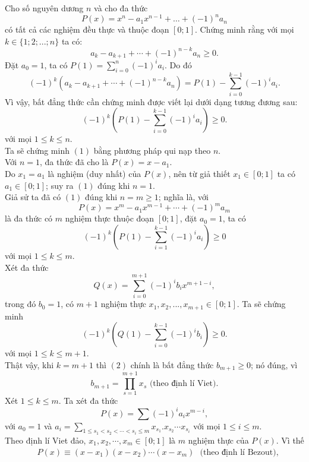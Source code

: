 \begin{bt}%
	Cho số nguyên dương $ n $ và cho đa thức 
	\[ P(x) = x^n - a_1 x^{n-1} + \dots + (-1)^n a_n \]
	có tất cả các nghiệm đều thực và thuộc đoạn $ \left [ 0;1 \right ] $.
	Chứng minh rằng với mọi $ k \in \{1;2;...;n \} $ ta có:
	\[ a_k - a_{k+1} + \cdots + (-1)^{n-k}a_n \ge 0. \]
	\loigiai
	{
		Đặt $ a_0 = 1 $, ta có $ P(1) = \sum\limits_{i=0}^{n} (-1)^i a_i $. Do đó
		\[ (-1)^k \left(a_k - a_{k+1} + \cdots + (-1)^{n-k} a_n \right) = P(1) - \sum\limits_{i=0}^{k-1} (-1)^i a_i. \]
		Vì vậy, bất đẳng thức cần chứng minh được viết lại dưới dạng tương đương sau:
		\[ (-1)^k\left(P(1) - \sum\limits_{i=0}^{k-1} (-1)^i a_i \right) \ge 0.\tag{1}\]
		với mọi $ 1 \le k \le n $.\\
		Ta sẽ chứng minh $ (1) $ bằng phương pháp qui nạp theo $ n $.\\
		Với $ n = 1 $, đa thức đã cho là $ P(x) = x - a_1 $.\\
		Do $ x_1 = a_1 $ là nghiệm (duy nhất) của $ P(x) $, nên từ giả thiết $ x_1 \in \left[0;1 \right]  $ ta có $ a_1 \in \left[0;1 \right]  $; suy ra $ (1) $ đúng khi $ n=1 $.\\
		Giả sử ta đã có $ (1) $ đúng khi $ n = m \ge 1 $; nghĩa là, với
		\[ P(x) = x^m - a_1 x^{m-1} + \cdots + (-1)^ma_m \]
		là đa thức có $ m $ nghiệm thực thuộc đoạn $ \left[ 0;1\right]  $, đặt $ a_0 = 1 $, ta có
		\[ (-1)^k \left(P(1) - \sum\limits_{i=1}^{k-1} (-1)^ia_i \right)  \ge 0 \]
		với mọi $ 1 \le k \le m $.\\
		Xét đa thức
		\[ Q(x) = \sum\limits_{i=0}^{m+1}(-1)^ib_ix^{m+1-i}, \]
		trong đó $ b_0 = 1 $, có $ m+1 $ nghiệm thực $ x_1, x_2 ,..., x_{m+1} \in \left[0;1 \right]  $. Ta sẽ chứng minh 
		\[ (-1)^k\left(Q(1) - \sum\limits_{i=0}^{k-1}(-1)^i b_i\right) \ge 0.\tag{2}\]
		với mọi $ 1 \le k \le m+1 $.\\
		Thật vậy, khi $ k = m+1 $ thì $ (2) $ chính là bất đẳng thức $ b_{m+1} \ge 0 $; nó đúng, vì
		\[ b_{m+1} = \prod\limits_{s=1}^{m+1} x_s\text{ (theo định lí Viet).} \]
		Xét $ 1 \le k \le m $. Ta xét đa thức
		\[ P(x) = \sum\limits(-1)^i a_i x^{m-i}, \]
		với $ a_0 = 1 $ và $ a_i = \sum\limits_{1\le s_1 < s_2 < \cdots < s_i \le m} x_{s_1}. x_{s_2} \cdots x_{s_i} $ với mọi $ 1 \le i \le m $.\\
		Theo định lí Viet đảo, $ x_1, x_2, \cdots, x_m \in \left[ 0;1\right]  $ là $ m $ nghiệm thực của $ P(x) $. Vì thế
	{\allowdisplaybreaks
	\begin{align*}
	&P(x) \equiv (x-x_1)(x-x_2)\cdots (x-x_m) \,\,  \text{ (theo định lí Bezout),}\tag{3}\\

\end{align*}}}
\end{bt}
